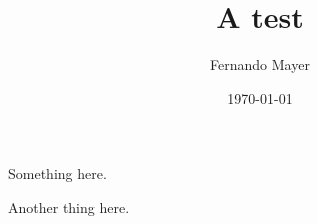 \documentclass[a4paper]{article}
\title{A test}
\author{Fernando Mayer}
\date{\today}
\begin{document}
\maketitle

Something here.

Another thing here.
\end{document}

